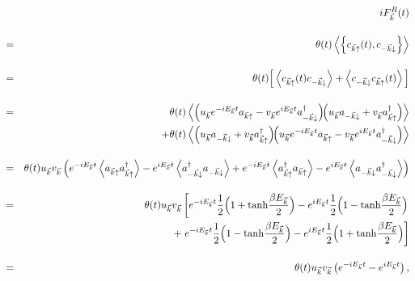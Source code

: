 \documentclass[uplatex,a4j,12pt,dvipdfmx]{jsarticle}
\begin{document}
\begin{eqnarray}
	&&
	i
	F_{\vec{k}}^{R}(t)
	\nonumber \\[4mm] &=&
	\theta(t)
	\left\langle \left\{
	c_{\vec{k} \uparrow}(t), c_{-\vec{k} \downarrow}
	\right\} \right\rangle
	\nonumber \\[4mm] &=&
	\theta(t)
	\Big[
		\left\langle
		c_{\vec{k} \uparrow}(t) c_{-\vec{k} \downarrow}
		\right\rangle
		+
		\left\langle
		c_{-\vec{k} \downarrow} c_{\vec{k} \uparrow}(t)
		\right\rangle
		\Big]
	\nonumber \\[4mm] &=&
	\theta(t)
	\left\langle
	\left(
	u_{\vec{k}} e^{ - i E_{\vec{k}} t }
	a_{\vec{k} \uparrow}
	-
	v_{\vec{k}} e^{ i E_{\vec{k}} t }
	a_{-\vec{k} \downarrow}^{\dagger}
	\right)
	\!\!
	\left(
	u_{\vec{k}} a_{-\vec{k} \downarrow}
	+
	v_{\vec{k}} a_{\vec{k} \uparrow}^{\dagger}
	\right)
	\right\rangle
	\nonumber \\ && \hspace{5mm} +
	\theta(t)
	\left\langle
	\left(
	u_{\vec{k}} a_{-\vec{k} \downarrow}
	+
	v_{\vec{k}} a_{\vec{k} \uparrow}^{\dagger}
	\right)
	\!\!
	\left(
	u_{\vec{k}} e^{ - i E_{\vec{k}} t }
	a_{\vec{k} \uparrow}
	-
	v_{\vec{k}} e^{ i E_{\vec{k}} t }
	a_{-\vec{k} \downarrow}^{\dagger}
	\right)
	\right\rangle
	\nonumber \\[4mm]
	&=&
	\theta(t)
	u_{\vec{k}}
	v_{\vec{k}}
	\left(
	e^{ - i E_{\vec{k}} t }
	\left\langle
	a_{\vec{k} \uparrow}
	a_{\vec{k} \uparrow}^{\dagger}
	\right\rangle
	-
	e^{ i E_{\vec{k}} t }
	\left\langle
	a_{-\vec{k} \downarrow}^{\dagger}
	a_{-\vec{k} \downarrow}
	\right\rangle
	+
	e^{ - i E_{\vec{k}} t }
	\left\langle
	a_{\vec{k} \uparrow}^{\dagger}
	a_{\vec{k} \uparrow}
	\right\rangle
	-
	e^{ i E_{\vec{k}} t }
	\left\langle
	a_{-\vec{k} \downarrow}
	a_{-\vec{k} \downarrow}^{\dagger}
	\right\rangle
	\right)
	\nonumber \\[4mm]
	&=&
	\theta(t)
	u_{\vec{k}}
	v_{\vec{k}}
	\left[
		e^{ - i E_{\vec{k}} t }
		\dfrac{1}{2}
		\Big( 1 + {\rm tanh}\dfrac{\beta E_{\vec{k}}}{2} \Big)
		-
		e^{ i E_{\vec{k}} t }
		\dfrac{1}{2}
		\Big( 1 - {\rm tanh}\dfrac{\beta E_{\vec{k}}}{2} \Big)
		\right.
		\nonumber \\ && \hspace{5mm} +
		\left.
		e^{ - i E_{\vec{k}} t }
		\dfrac{1}{2}
		\Big( 1 - {\rm tanh}\dfrac{\beta E_{\vec{k}}}{2} \Big)
		-
		e^{ i E_{\vec{k}} t }
		\dfrac{1}{2}
		\Big( 1 + {\rm tanh}\dfrac{\beta E_{\vec{k}}}{2} \Big)
		\right]
	\nonumber \\[4mm] &=&
	\theta(t)
	u_{\vec{k}}
	v_{\vec{k}}
	\left(
	e^{ - i E_{\vec{k}} t }
	-
	e^{ i E_{\vec{k}} t }
	\right)
	,
\end{eqnarray}
\end{document}
